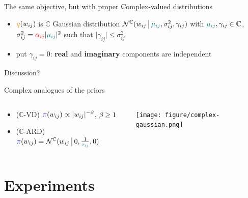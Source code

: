 \documentclass{beamer}
\newcommand{\cplx}{\mathbb{C}}
\begin{document}
\begin{frame}[c]{\insertsection}
The same objective, but with proper Complex-valued distributions
\begin{itemize}
  \item $
    {\color{orange} q}(w_{ij})
  $ is $\cplx$ Gaussian distribution $
    \mathcal{N}^{\cplx}(
      w_{ij}\,\big\vert\,
      {\color{teal} \mu_{ij}},
      \sigma^2_{ij},
      \gamma_{ij}
    )
  $ with $
    {\color{teal} \mu_{ij}}, \gamma_{ij} \in \cplx
  $, $
    \sigma^2_{ij}
      = {\color{red} \alpha_{ij}}
        \lvert {\color{teal} \mu_{ij}} \rvert^2
  $ such that $\lvert \gamma_{ij}\rvert \leq \sigma^2_{ij}$
  \item put $\gamma_{ij} = 0$: 
    \textbf{real} and \textbf{imaginary} components are independent
\end{itemize} 

Discussion?

\medskip
Complex analogues of the priors
\begin{columns}[T]
  \begin{column}{0.63\linewidth}
    \begin{itemize}
      \item ($\cplx$-VD) $
        {\color{blue} \pi}(w_{ij})
            \propto \lvert w_{ij}\rvert^{-\beta}
      $, $\beta \geq 1$
      \smallskip
      \item ($\cplx$-ARD) $
        {\color{blue} \pi}(w_{ij})
            = \mathcal{N}^{\cplx}(
              w_{ij}\,\big\vert\,
              0, \tfrac1{{\color{teal} \tau_{ij}}}, 0
            )
      $
    \end{itemize}
  \end{column}
  \begin{column}{0.35\linewidth}
    \texttt{[image: figure/complex-gaussian.png]}
  \end{column}
\end{columns}

\end{frame}



\section{Experiments} %
\label{sec:experiments}
\end{document}

